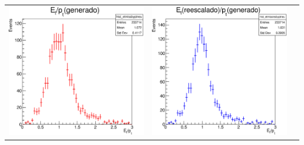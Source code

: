 \documentclass[10pt]{beamer}
\begin{document}
\begin{frame}
	\begin{center}
		\begin{tabular}{ccc}
			
			\includegraphics[scale=0.18]{plot-etmissbyptneu.eps} &
				\includegraphics[scale=0.18]{plot-etmissresbyptneu.eps}&

\end{tabular}
\end{center}
\end{frame}
\end{document}
